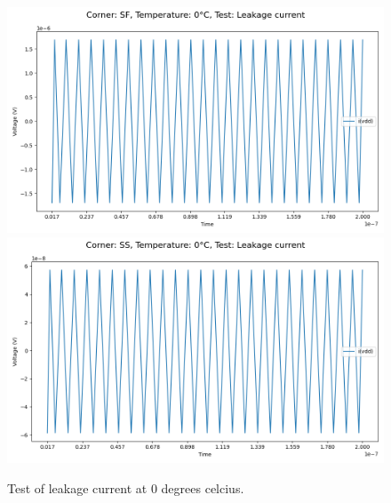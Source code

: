\begin{figure}[H]
    \vspace{5pt}
    \includegraphics[height= 0.21\textheight]{figures/aimspice/SF/0/I.csv.png}
    \vspace{5pt}
    \includegraphics[height= 0.21\textheight]{figures/aimspice/SS/0/I.csv.png}
    \caption{Test of leakage current at 0 degrees celcius.}
    \label{fig:aimspice_I_0}
\end{figure}

\pagebreak

